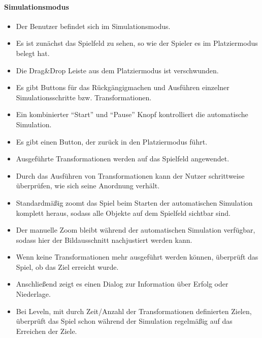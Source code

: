 \paragraph{Simulationsmodus}
\begin{itemize}
\item Der Benutzer befindet sich im Simulationsmodus.
\item Es ist zunächst das Spielfeld zu sehen, so wie der Spieler es im Platziermodus belegt hat.
\item Die Drag\&Drop Leiste aus dem Platziermodus ist verschwunden.
\item Es gibt Buttons für das Rückgängigmachen und Ausführen 
einzelner Simulationsschritte bzw. Transformationen.
\item Ein kombinierter "`Start"' und "`Pause"' Knopf kontrolliert die automatische Simulation.
\item Es gibt einen Button, der zurück in den Platziermodus führt.
\item Ausgeführte Transformationen werden auf das Spielfeld angewendet.
\item Durch das Ausführen von Transformationen kann der Nutzer schrittweise
überprüfen, wie sich seine Anordnung verhält.
\item Standardmäßig zoomt das Spiel beim Starten der automatischen Simulation komplett heraus, sodass alle Objekte auf dem Spielfeld sichtbar sind.
\item Der manuelle Zoom bleibt während der automatischen Simulation verfügbar, sodass hier der Bildausschnitt nachjustiert werden kann.
\item Wenn keine Transformationen mehr ausgeführt werden können, überprüft das Spiel, ob das Ziel erreicht
wurde.
\item Anschließend zeigt es einen Dialog zur Information über Erfolg oder Niederlage.
\item Bei Leveln, mit durch Zeit/Anzahl der Transformationen definierten Zielen,
überprüft das Spiel schon während der Simulation regelmäßig auf das Erreichen
der Ziele.
\end{itemize}

